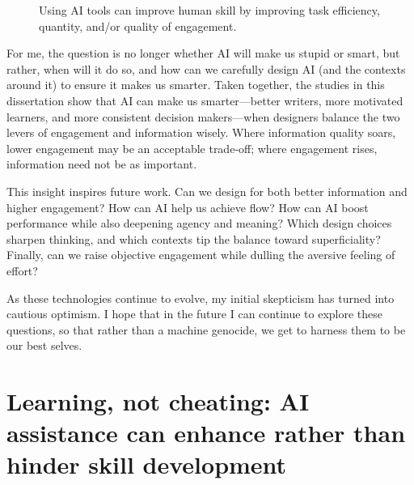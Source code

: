 \documentclass[11pt]{report}
\begin{document}
\begin{mainf}
\begin{figure}[ht]
    \caption{Using AI tools can improve human skill by improving task efficiency, quantity, and/or quality of engagement.}
\end{figure}

For me, the question is no longer whether AI will make us stupid or smart, but rather, when will it do so, and how can we carefully design AI (and the contexts around it) to ensure it makes us smarter. 
Taken together, the studies in this dissertation show that AI can make us smarter—better writers, more motivated learners, and more consistent decision makers—when designers balance the two levers of engagement and information wisely. 
Where information quality soars, lower engagement may be an acceptable trade‑off; where engagement rises, information need not be as important. 

This insight inspires future work. 
Can we design for both better information and higher engagement? 
How can AI help us achieve flow? 
How can AI boost performance while also deepening agency and meaning? 
Which design choices sharpen thinking, and which contexts tip the balance toward superficiality? 
Finally, can we raise objective engagement while dulling the aversive feeling of effort? 

As these technologies continue to evolve, my initial skepticism has turned into cautious optimism. 
I hope that in the future I can continue to explore these questions, so that rather than a machine genocide, we get to harness them to be our best selves.



\chapter{Learning, not cheating: AI assistance can enhance rather than hinder skill development}


\end{mainf}
\end{document}
